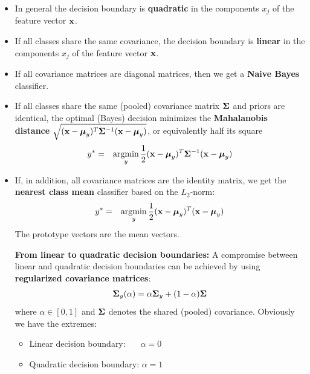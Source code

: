   \begin{itemize}
    \item In general the decision boundary is \textbf{quadratic} in the components $x_j$ 
      of the feature vector $\bm{\mathrm{x}}$. 
    \item If all classes share the same covariance, the decision boundary is \textbf{linear} in the components $x_j$ of the feature vector $\bm{\mathrm{x}}$. 
    \item If all covariance matrices are diagonal matrices, then we get a \textbf{Naive Bayes} classifier.
    \item If all classes share the same (pooled) covariance matrix $\mathbf{\Sigma}$ and priors are identical, the optimal (Bayes) decision minimizes the \textbf{Mahalanobis distance} $\sqrt{(\bm{\mathrm{x}}-\bm{\mathrm{\mu}}_y)^T\mathbf{\Sigma}^{-1}(\bm{\mathrm{x}}-\bm{\mathrm{\mu}}_y)}$, or equivalently half its square
      \begin{eqnarray*}
        y^* &=& \operatorname*{argmin}_{y} \frac{1}{2} (\bm{\mathrm{x}}-\bm{\mathrm{\mu}}_y)^T\mathbf{\Sigma}^{-1}(\bm{\mathrm{x}}-\bm{\mathrm{\mu}}_y)
      \end{eqnarray*}
    \item If, in addition, all covariance matrices are the identity matrix, we get the \textbf{nearest class mean} classifier based on the $L_2$-norm:
      \begin{eqnarray*}
        y^* &=& \operatorname*{argmin}_{y} \frac{1}{2} (\bm{\mathrm{x}}-\bm{\mathrm{\mu}}_y)^T(\bm{\mathrm{x}}-\bm{\mathrm{\mu}}_y)
      \end{eqnarray*}
      The prototype vectors are the mean vectors.
        
  \textbf{From linear to quadratic decision boundaries:} 
  A compromise between linear and quadratic decision boundaries can be achieved by using \textbf{regularized covariance matrices}:
%  
  \begin{eqnarray*}
    \mathbf{\Sigma}_y (\alpha)= \alpha \mathbf{\Sigma}_y + (1-\alpha)\mathbf{\Sigma}
  \end{eqnarray*}  
  where $\alpha\in [0,1]$ and $\mathbf{\Sigma}$ denotes the shared (pooled) covariance.  Obviously we have the extremes:
  \begin{itemize}
    \item Linear decision boundary: $\quad ~~\alpha = 0$
    \item Quadratic decision boundary: $\alpha =1$
  \end{itemize}
  \end{itemize}
  
